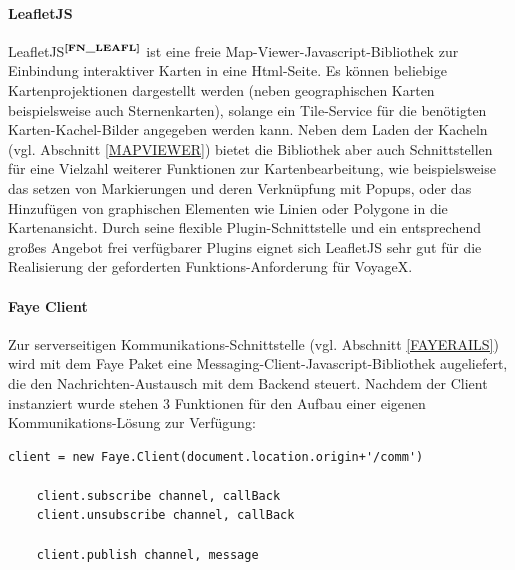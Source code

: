 \paragraph{LeafletJS}
{LeafletJS$^{\textbf{\ref{FN_LEAFL}}}$}\label{LEAFL}
ist eine freie Map-Viewer-Javascript-Bibliothek zur Einbindung interaktiver Karten in eine Html-Seite.
Es können beliebige Kartenprojektionen dargestellt werden (neben geographischen Karten beispielsweise auch Sternenkarten), solange ein Tile-Service für die benötigten Karten-Kachel-Bilder angegeben werden kann.
Neben dem Laden der Kacheln (vgl. Abschnitt \ref{MAPVIEWER}) bietet die Bibliothek aber auch Schnittstellen für eine Vielzahl weiterer Funktionen zur Kartenbearbeitung, wie beispielsweise das setzen von Markierungen und deren Verknüpfung mit Popups, oder das Hinzufügen von graphischen Elementen wie Linien oder Polygone in die Kartenansicht. 
Durch seine flexible Plugin-Schnittstelle und ein entsprechend großes Angebot frei verfügbarer Plugins eignet sich LeafletJS sehr gut für die Realisierung der geforderten Funktions-Anforderung für VoyageX.

\paragraph{Faye Client}
Zur serverseitigen Kommunikations-Schnittstelle (vgl. Abschnitt \ref{FAYERAILS}) wird mit dem Faye Paket
eine Messaging-Client-Javascript-Bibliothek augeliefert, die den Nachrichten-Austausch mit dem Backend steuert. Nachdem der Client instanziert wurde stehen 3 Funktionen für den Aufbau einer eigenen Kommunikations-Lösung zur Verfügung:\\
\lstset{language=JavaScript}
\begin{lstlisting}[frame=single,numbers=none,xleftmargin=0pt,caption={API des Faye-Clients},captionpos=b]
    client = new Faye.Client(document.location.origin+'/comm')

    client.subscribe channel, callBack
    client.unsubscribe channel, callBack

    client.publish channel, message
\end{lstlisting}

